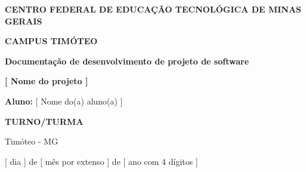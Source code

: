 \begin{center}

\begin{Large}
    \textbf{CENTRO FEDERAL DE EDUCAÇÃO TECNOLÓGICA DE MINAS GERAIS }
\end{Large}

\vspace{0.5cm}

\begin{normalsize}
    \textbf{CAMPUS TIMÓTEO}
\end{normalsize}

\vspace{5cm}

\begin{Huge}

    \textbf{Documentação de desenvolvimento de projeto de software}
    
    \vspace{0.5cm}
    
   \textbf{ {\color{red}[ Nome do projeto ]}}
    
\end{Huge}

\vspace{5cm}

\textbf{Aluno: } {\color{red} [ Nome do(a) aluno(a) ]}

\vspace{0.5cm}

\textbf{{\color{red}TURNO/TURMA}}

\vspace{2cm}

Timóteo - MG

\vspace{1cm}

{\color{red} [ dia ]} de {\color{red} [ mês por extenso ] } de {\color{red} [ ano com 4 dígitos ] }

\end{center}

\newpage